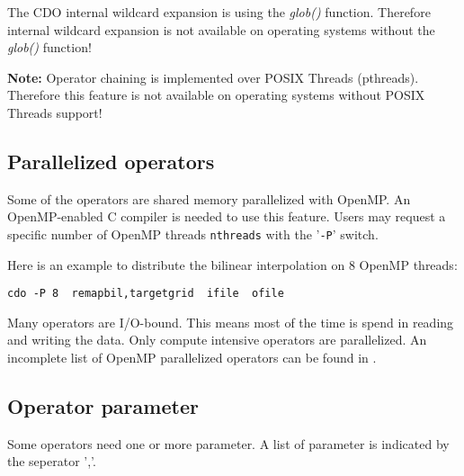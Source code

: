 The CDO internal wildcard expansion is using the {\it glob()} function. 
Therefore internal wildcard expansion is not available on operating systems without the {\it glob()} function!

{\bf Note:}
Operator chaining is implemented over POSIX Threads (pthreads).
Therefore this {\CDO} feature is not available on operating systems without POSIX Threads support!


\subsection{Parallelized operators}

Some of the {\CDO} operators are shared memory parallelized with OpenMP.
An OpenMP-enabled C compiler is needed to use this feature.
Users may request a specific number of OpenMP threads {\tt nthreads} with the '{\tt -P}' switch.

Here is an example to distribute the bilinear interpolation on 8 OpenMP threads:
\begin{lstlisting}[frame=single, backgroundcolor=\color{pcolor2}, basicstyle=\ttfamily, columns=flexible]
   cdo -P 8  remapbil,targetgrid  ifile  ofile
\end{lstlisting}

Many {\CDO} operators are I/O-bound. This means most of the time is spend in reading and writing the data. 
Only compute intensive {\CDO} operators are parallelized. 
An incomplete list of OpenMP parallelized operators can be found in .

\subsection{Operator parameter}

Some operators need one or more parameter. A list of parameter is indicated by the seperator ','.

